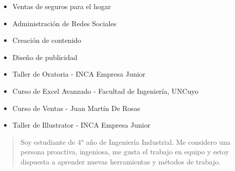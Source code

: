 \documentclass[10pt,a4paper,ragged2e,withhyper]{altacv}
\begin{document}
\begin{paracol}{2}

\begin{itemize}
\item Ventas de seguros para el hogar
\end{itemize}
\begin{itemize}
\item  Administración de Redes Sociales
\item Creación de contenido
\item Diseño de publicidad

\end{itemize}

\divider


\divider


\divider

\begin{itemize}
\item Taller de Oratoria - INCA Empresa Junior
\item Curso de Excel Avanzado - Facultad de Ingeniería, UNCuyo
\item Curso de Ventas - Juan Martín De Rosas
\item Taller de Illustrator - INCA Empresa Junior
\end{itemize}





\switchcolumn

\begin{quote}
Soy estudiante de 4° año de
Ingeniería Industrial. Me considero una
persona proactiva, ingeniosa, me
gusta el trabajo en equipo y estoy
dispuesta a aprender nuevas
herramientas y métodos de trabajo.


\end{quote}
\end{paracol}
\end{document}
